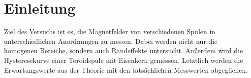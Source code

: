 \section{Einleitung}
\label{sec:Einleitung}
Ziel des Versuchs ist es, die Magnetfelder von verschiedenen Spulen in unterschiedlichen Anordnungen zu messen. 
Dabei werden nicht nur die homogenen Bereiche, sondern auch Randeffekte untersucht.
Außerdem wird die Hysteresekurve einer Toroidspule mit Eisenkern gemessen.
Letztlich werden die Erwartungswerte aus der Theorie mit den tatsächlichen Messwerten abgeglichen.